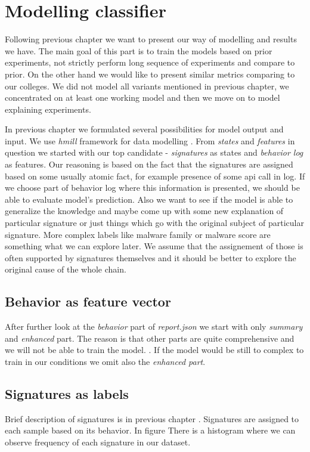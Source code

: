\chapter{Modelling classifier} \label{chap:models}
Following previous chapter we want to present our way of modelling and results we have. The main goal of this part is to train the models based on prior experiments, not strictly perform long sequence of experiments and compare to prior. On the other hand we would like to present similar metrics comparing to our colleges. We did not model all variants mentioned in previous chapter, we concentrated on at least one working model and then we move on to model explaining experiments.

In previous chapter we formulated several possibilities for model output and input. We use \emph{hmill} framework for data modelling . From \emph{states} and \emph{features} in question we started with our top candidate - \emph{signatures} as states and \emph{behavior log} as features. Our reasoning is based on the fact that the signatures are assigned based on some usually atomic fact, for example presence of some api call in log. If we choose part of behavior log where this information is presented, we should be able to evaluate model's prediction. Also we want to see if the model is able to generalize the knowledge and maybe come up with some new explanation of particular signature or just things which go with the original subject of particular signature. More complex labels like malware family or malware score are something what we can explore later. We assume that the assignement of those is often supported by signatures themselves and it should be better to explore the original cause of the whole chain.

\section{Behavior as feature vector}
After further look at the \emph{behavior} part of \emph{report.json} we start with only \emph{summary} and \emph{enhanced} part. The reason is that other parts are quite comprehensive and we will not be able to train the model. . If the model would be still to complex to train in our conditions we omit also the \emph{enhanced part}.

\section{Signatures as labels}
Brief description of signatures is in previous chapter . Signatures are assigned to each sample based on its behavior. In figure  There is a histogram where we can observe frequency of each signature in our dataset.

